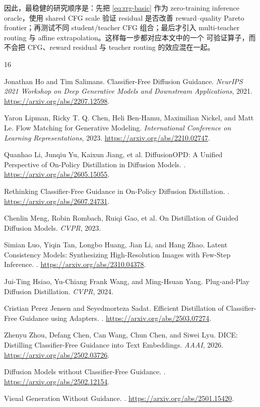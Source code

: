 \documentclass[11pt,a4paper]{article}
\theoremstyle{definition}
\theoremstyle{plain}
\begin{document}
因此，最稳健的研究顺序是：先把 \eqref{eq:rrg-basic} 作为 zero-training
inference oracle，使用 shared CFG scale 验证 residual 是否改善 reward--quality
Pareto frontier；再测试不同 student/teacher CFG 组合；最后才引入
multi-teacher routing 与 affine extrapolation。这样每一步都对应本文中的一个
可验证算子，而不会把 CFG、reward residual 与 teacher routing 的效应混在一起。

\begin{thebibliography}{16}

Jonathan Ho and Tim Salimans.
\newblock Classifier-Free Diffusion Guidance.
\newblock \emph{NeurIPS 2021 Workshop on Deep Generative Models and Downstream
Applications}, 2021.
\newblock \url{https://arxiv.org/abs/2207.12598}.

Yaron Lipman, Ricky T. Q. Chen, Heli Ben-Hamu, Maximilian Nickel, and Matt Le.
\newblock Flow Matching for Generative Modeling.
\newblock \emph{International Conference on Learning Representations}, 2023.
\newblock \url{https://arxiv.org/abs/2210.02747}.

Quanhao Li, Junqiu Yu, Kaixun Jiang, et al.
\newblock DiffusionOPD: A Unified Perspective of On-Policy Distillation in
Diffusion Models.
.
\newblock \url{https://arxiv.org/abs/2605.15055}.

Rethinking Classifier-Free Guidance in On-Policy Diffusion Distillation.
.
\newblock \url{https://arxiv.org/abs/2607.24731}.

Chenlin Meng, Robin Rombach, Ruiqi Gao, et al.
\newblock On Distillation of Guided Diffusion Models.
\newblock \emph{CVPR}, 2023.

Simian Luo, Yiqin Tan, Longbo Huang, Jian Li, and Hang Zhao.
\newblock Latent Consistency Models: Synthesizing High-Resolution Images with
Few-Step Inference.
.
\newblock \url{https://arxiv.org/abs/2310.04378}.

Jui-Ting Hsiao, Yu-Chiang Frank Wang, and Ming-Hsuan Yang.
\newblock Plug-and-Play Diffusion Distillation.
\newblock \emph{CVPR}, 2024.

Cristian Perez Jensen and Seyedmorteza Sadat.
\newblock Efficient Distillation of Classifier-Free Guidance using Adapters.
.
\newblock \url{https://arxiv.org/abs/2503.07274}.

Zhenyu Zhou, Defang Chen, Can Wang, Chun Chen, and Siwei Lyu.
\newblock DICE: Distilling Classifier-Free Guidance into Text Embeddings.
\newblock \emph{AAAI}, 2026.
\newblock \url{https://arxiv.org/abs/2502.03726}.

Diffusion Models without Classifier-Free Guidance.
.
\newblock \url{https://arxiv.org/abs/2502.12154}.

Visual Generation Without Guidance.
.
\newblock \url{https://arxiv.org/abs/2501.15420}.

\end{thebibliography}
\end{document}
